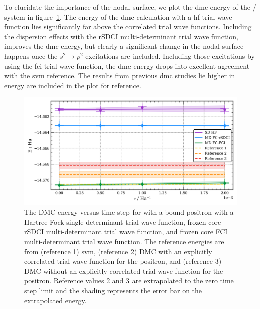 To elucidate the importance of the nodal surface, we plot the \gls{dmc} energy of the / system in figure~\ref{fig:be_md_extrap}.
The energy of the \gls{dmc} calculation with a \gls{hf} trial wave function lies significantly far above the correlated trial wave functions.
Including the dispersion effects with the \gls{rSDCI} multi-determinant trial wave function, improves the \gls{dmc} energy, but clearly a significant change in the nodal surface happens once the $s^2\rightarrow p^2$ excitations are included.
Including those excitations by using the \gls{fci} trial wave function, the \gls{dmc} energy drops into excellent agreement with the \gls{svm} reference.
The results from previous \gls{dmc} studies lie higher in energy are included in the plot for reference.\cite{10.1021/acs.jctc.1c01193, 10.1063/1.1486447}

\begin{figure}
    \includegraphics[width=\columnwidth,keepaspectratio]{Images/chapter5/be_extrap_multidet.png}
    \caption{\label{fig:be_md_extrap} The DMC energy versus time step for  with a bound positron with a Hartree-Fock single determinant trial wave function, frozen core rSDCI multi-determinant trial wave function, and frozen core FCI multi-determinant trial wave function. The reference energies are from (reference 1) \gls{svm}\cite{10.4208/jams.071510.072110a}, (reference 2) DMC with an explicitly correlated trial wave function for the positron\cite{10.1021/acs.jctc.1c01193}, and (reference 3) DMC without an explicitly correlated trial wave function for the positron\cite{10.1021/acs.jctc.1c01193}. Reference values 2 and 3 are extrapolated to the zero time step limit and the shading represents the error bar on the extrapolated energy.}
\end{figure}


